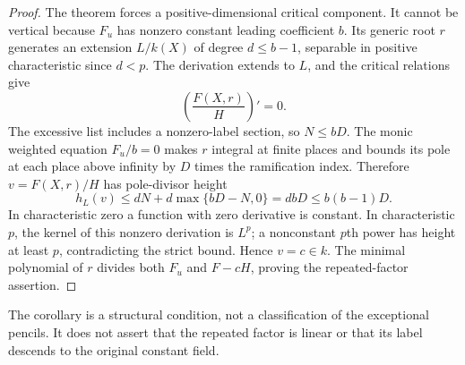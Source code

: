 \begin{proof}
The theorem forces a positive-dimensional critical component.  It cannot
be vertical because $F_u$ has nonzero constant leading coefficient $b$.
Its generic root $r$ generates an extension $L/k(X)$ of degree
$d\le b-1$, separable in positive characteristic since $d<p$.
The derivation extends to $L$, and the critical relations give
\[
 \left(\frac{F(X,r)}{H}\right)'=0.
\]
The excessive list includes a nonzero-label section, so $N\le bD$.
The monic weighted equation $F_u/b=0$ makes $r$ integral at finite
places and bounds its pole at each place above infinity by $D$ times
the ramification index.  Therefore $v=F(X,r)/H$ has pole-divisor height
\[
 h_L(v)\le dN+d\max\{bD-N,0\}=dbD\le b(b-1)D.
\]
In characteristic zero a function with zero derivative is constant.
In characteristic $p$, the kernel of this nonzero derivation is $L^p$;
a nonconstant $p$th power has height at least $p$, contradicting the
strict bound.  Hence $v=c\in k$.  The minimal polynomial of $r$ divides
both $F_u$ and $F-cH$, proving the repeated-factor assertion.
\end{proof}

The corollary is a structural condition, not a classification of the
exceptional pencils.  It does not assert that the repeated factor is
linear or that its label descends to the original constant field.
